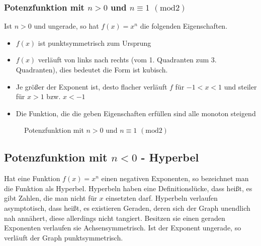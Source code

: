 \subsubsection{Potenzfunktion mit $n>0$ und $ n\equiv1$ $(\mathrm{mod}2)$}
Ist $n>0$ und ungerade, so hat $f(x)=x^n$ die folgenden Eigenschaften.
\begin{itemize}
	\item $f(x)$ ist punktsymmetrisch zum Ursprung
	\item $f(x)$ verläuft von links nach rechts (vom 1. Quadranten zum 3. Quadranten), dies bedeutet die Form ist kubisch. %
	\item Je größer der Exponent ist, desto flacher verläuft $f$ für $-1<x<1$ und steiler für $x>1$ bzw. $x<-1$
	\item Die Funktion, die die geben Eigenschaften erfüllen sind alle monoton steigend
\end{itemize}
\begin{figure}[h]
\centering
{}
\caption{Potenzfunktion mit $n>0$ und $ n\equiv1$ $(\mathrm{mod}2)$}
\end{figure}
\pagebreak
\subsection{Potenzfunktion mit $n<0$ - Hyperbel}\label{sec:Potenzfunktionen/Potenzfunktionen mit negativem Exponenten}
Hat eine Funktion $f(x)=x^n$ einen negativen Exponenten, so bezeichnet man die Funktion als Hyperbel. Hyperbeln haben eine Definitionslücke, dass heißt, es gibt Zahlen, die man nicht für $x$ einsetzten darf. Hyperbeln verlaufen asymptotisch, dass heißt, es existieren Geraden, deren sich der Graph unendlich nah annähert, diese allerdings nicht tangiert. Besitzen sie einen geraden Exponenten verlaufen sie Achsensymmetrisch. Ist der Exponent ungerade, so verläuft der Graph punktsymmetrisch. 
